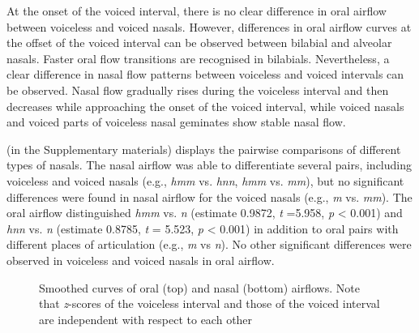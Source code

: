 \documentclass[output=paper]{langscibook}
\begin{document}
At the onset of the voiced interval, there is no clear difference in oral airflow between voiceless and voiced nasals. However, differences in oral airflow curves at the offset of the voiced interval can be observed between bilabial and alveolar nasals. Faster oral flow transitions are recognised in bilabials. Nevertheless, a clear difference in nasal flow patterns between voiceless and voiced intervals can be observed. Nasal flow gradually rises during the voiceless interval and then decreases while approaching the onset of the voiced interval, while voiced nasals and voiced parts of voiceless nasal geminates show stable nasal flow.

 (in the Supplementary materials) displays the pairwise comparisons of different types of nasals. The nasal airflow was able to differentiate several pairs, including voiceless and voiced nasals (e.g., \textit{hmm} vs. \textit{hnn}, \textit{hmm} vs. \textit{mm}), but no significant differences were found in nasal airflow for the voiced nasals (e.g., \textit{m} vs. \textit{mm}). The oral airflow distinguished \textit{hmm} vs. \textit{n} (estimate 0.9872, \textit{t} =5.958, \textit{p} < 0.001) and \textit{hnn} vs. \textit{n} (estimate 0.8785, \textit{t} = 5.523, \textit{p} < 0.001) in addition to oral pairs with different places of articulation (e.g., \textit{m} vs \textit{n}). No other significant differences were observed in voiceless and voiced nasals in oral airflow.


\begin{figure}
\caption{\label{fig:shinohara:4}Smoothed curves of oral (top) and nasal (bottom) airflows. Note that \textit{z}-scores of the voiceless interval and those of the voiced interval are independent with respect to each other}
\end{figure}
\end{document}
